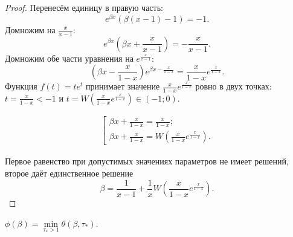 \begin{proof}
	Перенесём единицу в правую часть:
	\begin{equation*}
		e^{\beta x}(\beta(x - 1) - 1) = -1.
	\end{equation*}
	Домножим на $\frac{x}{x - 1}$:
	\begin{equation*}
		e^{\beta x}\left( \beta x + \frac{x}{x - 1} \right) = -\frac{x}{x - 1}. 
	\end{equation*}
	Домножим обе части уравнения на $e^{\frac{x}{x - 1}}$:
	\begin{equation*}
		\left( \beta x - \frac{x}{1 - x} \right) e^{\beta x - \frac{x}{1 - x}} = \frac{x}{1 - x} e^{\frac{x}{1 - x}}. 
	\end{equation*}
	Функция $f(t) = t e^t$ принимает значение $\frac{x}{1 - x} e^{\frac{x}{1 - x}}$ ровно в двух точках: $t = \frac{x}{1 - x} < -1$ и $t = W\left(\frac{x}{1 - x} e^{\frac{x}{1 - x}}\right) \in (-1; 0)$.
	
	\begin{align*}
		\left[
		\begin{array}{ll}
			\beta x + \frac{x}{1 - x} = \frac{x}{1 - x};\\
			\beta x + \frac{x}{1 - x} = W\left(\frac{x}{1 - x} e^{\frac{x}{1 - x}}\right).
		\end{array}
		\right.
	\end{align*}
	
	Первое равенство при допустимых значениях параметров не имеет решений, второе даёт единственное решение
	\[
	\beta = \frac{1}{x - 1} + \frac{1}{x} W\left(\frac{x}{1 - x} e^{\frac{x}{1 - x}}\right).
	\]
\end{proof}

\begin{proposition}
	\label{prop:phi_theta}
	$\phi(\beta) = \min\limits_{\tau_* > 1} \theta(\beta, \tau_*)$.
\end{proposition}

